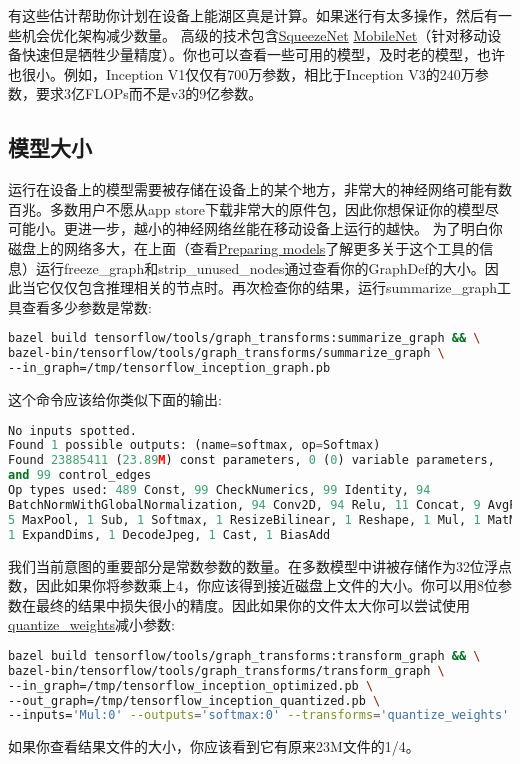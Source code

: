 有这些估计帮助你计划在设备上能湖区真是计算。如果迷行有太多操作，然后有一些机会优化架构减少数量。
高级的技术包含\href{https://arxiv.org/abs/1602.07360}{SqueezeNet} \href{https://arxiv.org/abs/1704.04861}{MobileNet}（针对移动设备快速但是牺牲少量精度）。你也可以查看一些可用的模型，及时老的模型，也许也很小。例如，Inception V1仅仅有700万参数，相比于Inception V3的240万参数，要求3亿FLOPs而不是v3的9亿参数。
\subsection{模型大小}
运行在设备上的模型需要被存储在设备上的某个地方，非常大的神经网络可能有数百兆。多数用户不愿从app store下载非常大的原件包，因此你想保证你的模型尽可能小。更进一步，越小的神经网络丝能在移动设备上运行的越快。
为了明白你磁盘上的网络多大，在上面（查看\href{https://www.tensorflow.org/mobile/prepare_models?hl=zh-cn}{Preparing models}了解更多关于这个工具的信息）运行freeze\_graph和strip\_unused\_nodes通过查看你的GraphDef的大小。因此当它仅仅包含推理相关的节点时。再次检查你的结果，运行summarize\_graph工具查看多少参数是常数:
\begin{lstlisting}[language=Bash]
bazel build tensorflow/tools/graph_transforms:summarize_graph && \
bazel-bin/tensorflow/tools/graph_transforms/summarize_graph \
--in_graph=/tmp/tensorflow_inception_graph.pb
\end{lstlisting}
这个命令应该给你类似下面的输出:
\begin{lstlisting}[language=Python]
No inputs spotted.
Found 1 possible outputs: (name=softmax, op=Softmax)
Found 23885411 (23.89M) const parameters, 0 (0) variable parameters,
and 99 control_edges
Op types used: 489 Const, 99 CheckNumerics, 99 Identity, 94
BatchNormWithGlobalNormalization, 94 Conv2D, 94 Relu, 11 Concat, 9 AvgPool,
5 MaxPool, 1 Sub, 1 Softmax, 1 ResizeBilinear, 1 Reshape, 1 Mul, 1 MatMul,
1 ExpandDims, 1 DecodeJpeg, 1 Cast, 1 BiasAdd 
\end{lstlisting}
我们当前意图的重要部分是常数参数的数量。在多数模型中讲被存储作为32位浮点数，因此如果你将参数乘上4，你应该得到接近磁盘上文件的大小。你可以用8位参数在最终的结果中损失很小的精度。因此如果你的文件太大你可以尝试使用\href{https://www.tensorflow.org/performance/quantization?hl=zh-cn}{quantize\_weights}减小参数:
\begin{lstlisting}[language=Bash]
bazel build tensorflow/tools/graph_transforms:transform_graph && \
bazel-bin/tensorflow/tools/graph_transforms/transform_graph \
--in_graph=/tmp/tensorflow_inception_optimized.pb \
--out_graph=/tmp/tensorflow_inception_quantized.pb \
--inputs='Mul:0' --outputs='softmax:0' --transforms='quantize_weights'
\end{lstlisting}
如果你查看结果文件的大小，你应该看到它有原来23M文件的1/4。

